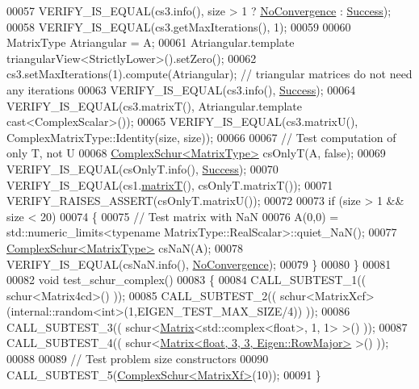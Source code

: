 \begin{DoxyCode}
00057   VERIFY\_IS\_EQUAL(cs3.info(), size > 1 ? \hyperlink{group__enums_gga85fad7b87587764e5cf6b513a9e0ee5eaba1c8763d1179778070f365ecc4157a8}{NoConvergence} : \hyperlink{group__enums_gga85fad7b87587764e5cf6b513a9e0ee5ea52581b035f4b59c203b8ff999ef5fcea}{Success});
00058   VERIFY\_IS\_EQUAL(cs3.getMaxIterations(), 1);
00059 
00060   MatrixType Atriangular = A;
00061   Atriangular.template triangularView<StrictlyLower>().setZero(); 
00062   cs3.setMaxIterations(1).compute(Atriangular); \textcolor{comment}{// triangular matrices do not need any iterations}
00063   VERIFY\_IS\_EQUAL(cs3.info(), \hyperlink{group__enums_gga85fad7b87587764e5cf6b513a9e0ee5ea52581b035f4b59c203b8ff999ef5fcea}{Success});
00064   VERIFY\_IS\_EQUAL(cs3.matrixT(), Atriangular.template cast<ComplexScalar>());
00065   VERIFY\_IS\_EQUAL(cs3.matrixU(), ComplexMatrixType::Identity(size, size));
00066 
00067   \textcolor{comment}{// Test computation of only T, not U}
00068   \hyperlink{group___eigenvalues___module}{ComplexSchur<MatrixType>} csOnlyT(A, \textcolor{keyword}{false});
00069   VERIFY\_IS\_EQUAL(csOnlyT.info(), \hyperlink{group__enums_gga85fad7b87587764e5cf6b513a9e0ee5ea52581b035f4b59c203b8ff999ef5fcea}{Success});
00070   VERIFY\_IS\_EQUAL(cs1.\hyperlink{group___eigenvalues___module_add3ab5ed83f7f2f06b79fa910a2d5684}{matrixT}(), csOnlyT.matrixT());
00071   VERIFY\_RAISES\_ASSERT(csOnlyT.matrixU());
00072 
00073   \textcolor{keywordflow}{if} (size > 1 && size < 20)
00074   \{
00075     \textcolor{comment}{// Test matrix with NaN}
00076     A(0,0) = std::numeric\_limits<typename MatrixType::RealScalar>::quiet\_NaN();
00077     \hyperlink{group___eigenvalues___module}{ComplexSchur<MatrixType>} csNaN(A);
00078     VERIFY\_IS\_EQUAL(csNaN.info(), \hyperlink{group__enums_gga85fad7b87587764e5cf6b513a9e0ee5eaba1c8763d1179778070f365ecc4157a8}{NoConvergence});
00079   \}
00080 \}
00081 
00082 \textcolor{keywordtype}{void} test\_schur\_complex()
00083 \{
00084   CALL\_SUBTEST\_1(( schur<Matrix4cd>() ));
00085   CALL\_SUBTEST\_2(( schur<MatrixXcf>(internal::random<int>(1,EIGEN\_TEST\_MAX\_SIZE/4)) ));
00086   CALL\_SUBTEST\_3(( schur<\hyperlink{group___core___module_class_eigen_1_1_matrix}{Matrix}<std::complex<float>, 1, 1> >() ));
00087   CALL\_SUBTEST\_4(( schur<\hyperlink{group___core___module_class_eigen_1_1_matrix}{Matrix<float, 3, 3, Eigen::RowMajor>} >() ));
00088 
00089   \textcolor{comment}{// Test problem size constructors}
00090   CALL\_SUBTEST\_5(\hyperlink{group___eigenvalues___module_class_eigen_1_1_complex_schur}{ComplexSchur<MatrixXf>}(10));
00091 \}
\end{DoxyCode}
